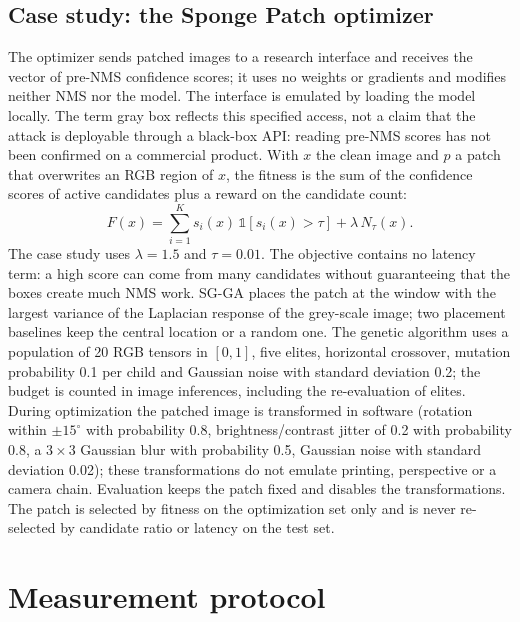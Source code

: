 \documentclass[a4paper,fleqn]{cas-dc}
\newcommand{\Ntau}{N_{\tau}}
\begin{document}
\subsection{Case study: the Sponge Patch optimizer}
The optimizer sends patched images to a research interface and receives the vector of pre-NMS confidence scores; it uses no weights or gradients and modifies neither NMS nor the model. The interface is emulated by loading the model locally. The term gray box reflects this specified access, not a claim that the attack is deployable through a black-box API: reading pre-NMS scores has not been confirmed on a commercial product. With $x$ the clean image and $p$ a patch that overwrites an RGB region of $x$, the fitness is the sum of the confidence scores of active candidates plus a reward on the candidate count:
\begin{equation}
F(x)=\sum_{i=1}^{K} s_i(x)\,\mathbb{1}[s_i(x)>\tau]+\lambda\,\Ntau(x) .
\end{equation}
The case study uses $\lambda=1.5$ and $\tau=0.01$.
The objective contains no latency term: a high score can come from many candidates without guaranteeing that the boxes create much NMS work. SG-GA places the patch at the window with the largest variance of the Laplacian response of the grey-scale image; two placement baselines keep the central location or a random one. The genetic algorithm uses a population of 20 RGB tensors in $[0,1]$, five elites, horizontal crossover, mutation probability 0.1 per child and Gaussian noise with standard deviation 0.2; the budget is counted in image inferences, including the re-evaluation of elites. During optimization the patched image is transformed in software (rotation within $\pm15^{\circ}$ with probability 0.8, brightness/contrast jitter of 0.2 with probability 0.8, a $3\times3$ Gaussian blur with probability 0.5, Gaussian noise with standard deviation 0.02); these transformations do not emulate printing, perspective or a camera chain. Evaluation keeps the patch fixed and disables the transformations. The patch is selected by fitness on the optimization set only and is never re-selected by candidate ratio or latency on the test set.

\section{Measurement protocol}
\label{sec:protocol}
\end{document}
